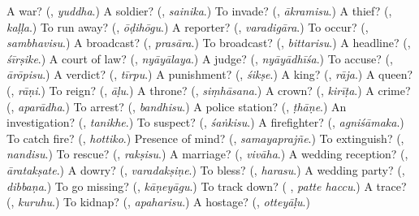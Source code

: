 \begin{tcolorbox}[breakable,colback=teal!4,colframe=teal!35!black,title={Before you move on}]
A war? (\textbf{}, \emph{yuddha}.) A soldier? (\textbf{}, \emph{sainika}.) To invade? (\textbf{}, \emph{ākramisu}.) A thief? (\textbf{}, \emph{kaḷḷa}.) To run away? (\textbf{}, \emph{ōḍihōgu}.) A reporter? (\textbf{}, \emph{varadigāra}.) To occur? (\textbf{}, \emph{sambhavisu}.) A broadcast? (\textbf{}, \emph{prasāra}.) To broadcast? (\textbf{}, \emph{bittarisu}.) A headline? (\textbf{}, \emph{śīrṣike}.) A court of law? (\textbf{}, \emph{nyāyālaya}.) A judge? (\textbf{}, \emph{nyāyādhīśa}.) To accuse? (\textbf{}, \emph{ārōpisu}.) A verdict? (\textbf{}, \emph{tīrpu}.) A punishment? (\textbf{}, \emph{śikṣe}.) A king? (\textbf{}, \emph{rāja}.) A queen? (\textbf{}, \emph{rāṇi}.) To reign? (\textbf{}, \emph{āḷu}.) A throne? (\textbf{}, \emph{siṃhāsana}.) A crown? (\textbf{}, \emph{kirīṭa}.) A crime? (\textbf{}, \emph{aparādha}.) To arrest? (\textbf{}, \emph{bandhisu}.) A police station? (\textbf{}, \emph{ṭhāṇe}.) An investigation? (\textbf{}, \emph{tanikhe}.) To suspect? (\textbf{}, \emph{śaṅkisu}.) A firefighter? (\textbf{}, \emph{agniśāmaka}.) To catch fire? (\textbf{}, \emph{hottiko}.) Presence of mind? (\textbf{}, \emph{samayaprajñe}.) To extinguish? (\textbf{}, \emph{nandisu}.) To rescue? (\textbf{}, \emph{rakṣisu}.) A marriage? (\textbf{}, \emph{vivāha}.) A wedding reception? (\textbf{}, \emph{āratakṣate}.) A dowry? (\textbf{}, \emph{varadakṣiṇe}.) To bless? (\textbf{}, \emph{harasu}.) A wedding party? (\textbf{}, \emph{dibbaṇa}.) To go missing? (\textbf{}, \emph{kāṇeyāgu}.) To track down? (\textbf{ }, \emph{patte haccu}.) A trace? (\textbf{}, \emph{kuruhu}.) To kidnap? (\textbf{}, \emph{apaharisu}.) A hostage? (\textbf{}, \emph{otteyāḷu}.)
\end{tcolorbox}
